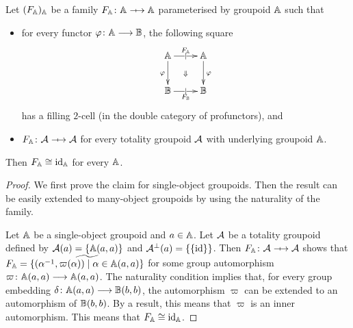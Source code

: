 \begin{lemma}
    Let \( (F_{\mathbb{A}})_{\mathbb{A}} \) be a family \( F_\Grp \colon \Grp \profarrow \Grp \) parameterised by groupoid \( \mathbb{A} \) such that
    \begin{itemize}
        \item for every functor \( \varphi \colon \mathbb{A} \longrightarrow \mathbb{B} \), the following square
        \begin{equation*}
            \xymatrix{
                \Grp \ar[d]_\varphi \ar[r]|{|}^{F_\Grp} \ar@{}[dr]|{\Downarrow} & \Grp \ar[d]^\varphi \\
                \Grpb \ar[r]|{|}_{F_\Grpb} & \Grpb
            }
        \end{equation*}
        has a filling \( 2 \)-cell (in the double category of profunctors), and
        \item \( F_\Grp \colon \creed \profarrow \creed \) for every totality groupoid \( \mathcal{A} \) with underlying groupoid \( \mathbb{A} \).
    \end{itemize}
    Then \( F_{\mathbb{A}} \cong \mathrm{id}_{\mathbb{A}} \) for every \( \mathbb{A} \).
\end{lemma}
\begin{proof}
    We first prove the claim for single-object groupoids.
    Then the result can be easily extended to many-object groupoids by using the naturality of the family.

    Let \( \mathbb{A} \) be a single-object groupoid and \( a \in \mathbb{A} \).
    Let \( \mathcal{A} \) be a totality groupoid defined by \( \mathcal{A}(a) = \{ \mathbb{A}(a,a) \} \) and \( \mathcal{A}^{\bot}(a) = \{ \{ \mathrm{id} \} \} \).
    Then \( F_{\Grp} \colon \creed \profarrow \creed \) shows that \( F_{\mathbb{A}} = \widetilde{\{ (\alpha^{-1}, \varpi(\alpha)) \mid \alpha \in \mathbb{A}(a,a) \}} \) for some group automorphism \( \varpi \colon \mathbb{A}(a,a) \longrightarrow \mathbb{A}(a,a) \).
    The naturality condition implies that, for every group embedding \( \delta \colon \mathbb{A}(a,a) \longrightarrow \mathbb{B}(b,b) \), the automorphism \( \varpi \) can be extended to an automorphism of \( \mathbb{B}(b,b) \).
    By a result, this means that \( \varpi \) is an inner automorphism.
    This means that \( F_{\mathbb{A}} \cong \mathrm{id}_{\mathbb{A}} \).
\end{proof}


